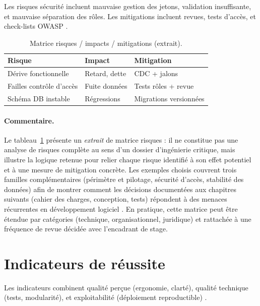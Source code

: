 Les risques sécurité incluent mauvaise gestion des jetons, validation insuffisante, et mauvaise séparation des rôles. Les mitigations incluent revues, tests d'accès, et check-lists OWASP \cite{owasp2021}.

\begin{table}[htbp]
  \centering
  \renewcommand{\arraystretch}{1.4}
  \setlength{\tabcolsep}{10pt}
  \caption{Matrice risques / impacts / mitigations (extrait).}
  \label{tab:risques-matrice}
  \begin{tabular}{|p{3.4cm}|p{4.6cm}|p{5.6cm}|}
    \hline
    \textbf{Risque} & \textbf{Impact} & \textbf{Mitigation} \\
    \hline
    Dérive fonctionnelle & Retard, dette & CDC + jalons \cite{sommerville2016} \\
    \hline
    Failles contrôle d'accès & Fuite données & Tests rôles + revue \cite{owasp2021} \\
    \hline
    Schéma DB instable & Régressions & Migrations versionnées \cite{kleppmann2017} \\
    \hline
  \end{tabular}
\end{table}

\paragraph{Commentaire.}
Le tableau~\ref{tab:risques-matrice} présente un \emph{extrait} de matrice risques : il ne constitue pas une analyse de risques complète au sens d'un dossier d'ingénierie critique, mais illustre la logique retenue pour relier chaque risque identifié à son effet potentiel et à une mesure de mitigation concrète. Les exemples choisis couvrent trois familles complémentaires (périmètre et pilotage, sécurité d'accès, stabilité des données) afin de montrer comment les décisions documentées aux chapitres suivants (cahier des charges, conception, tests) répondent à des menaces récurrentes en développement logiciel \cite{sommerville2016,owasp2021,kleppmann2017}. En pratique, cette matrice peut être étendue par catégories (technique, organisationnel, juridique) et rattachée à une fréquence de revue décidée avec l'encadrant de stage.

\section{Indicateurs de réussite}

Les indicateurs combinent qualité perçue (ergonomie, clarté), qualité technique (tests, modularité), et exploitabilité (déploiement reproductible) \cite{iso25010,ieee1012}.

